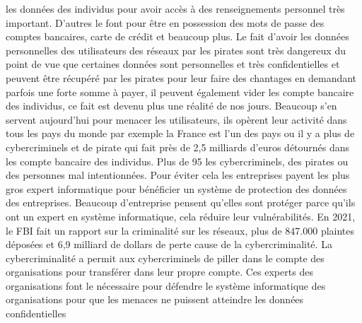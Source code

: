 \documentclass[12pt,a4paper,titlepage]{article}
\begin{document}
les données des individus pour avoir accès à des
renseignements personnel très important. D’autres le font
pour être en possession des mots de passe des comptes
bancaires, carte de crédit et beaucoup plus. Le fait d’avoir les
données personnelles des utilisateurs des réseaux par les
pirates sont très dangereux du point de vue que certaines
données sont personnelles et très confidentielles et peuvent
être récupéré par les pirates pour leur faire des chantages en
demandant parfois une forte somme à payer, il peuvent
également vider les compte bancaire des individus, ce fait est
devenu plus une réalité de nos jours. Beaucoup s’en servent
aujourd’hui pour menacer les utilisateurs, ils opèrent leur
activité dans tous les pays du monde par exemple la France
est l’un des pays ou il y a plus de cybercriminels et de pirate
qui fait près de 2,5 milliards d’euros détournés dans les
compte bancaire des individus.
Plus de 95%
les cybercriminels, des pirates ou des personnes mal
intentionnées. Pour éviter cela les entreprises payent les plus
gros expert informatique pour bénéficier un système de
protection des données des entreprises. Beaucoup
d’entreprise pensent qu’elles sont protéger parce qu’ils ont
un expert en système informatique, cela réduire leur
vulnérabilités. En 2021, le FBI fait un rapport sur la criminalité
sur les réseaux, plus de 847.000 plaintes déposées et 6,9
milliard de dollars de perte cause de la cybercriminalité. La
cybercriminalité a permit aux cybercriminels de piller dans le
compte des organisations pour transférer dans leur propre
compte. Ces experts des organisations font le nécessaire pour
défendre le système informatique des organisations pour que
les menaces ne puissent atteindre les données confidentielles
\end{document}

